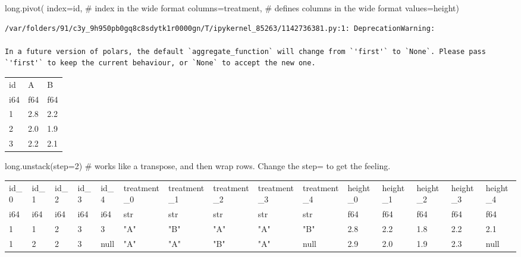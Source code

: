 \documentclass[
  letterpaper,
  DIV=11,
  numbers=noendperiod]{scrartcl}
\newenvironment{Shaded}{\begin{snugshade}}{\end{snugshade}}
\newcommand{\BuiltInTok}[1]{\textcolor[rgb]{0.00,0.23,0.31}{#1}}
\newcommand{\CommentTok}[1]{\textcolor[rgb]{0.37,0.37,0.37}{#1}}
\newcommand{\DecValTok}[1]{\textcolor[rgb]{0.68,0.00,0.00}{#1}}
\newcommand{\NormalTok}[1]{\textcolor[rgb]{0.00,0.23,0.31}{#1}}
\newcommand{\OperatorTok}[1]{\textcolor[rgb]{0.37,0.37,0.37}{#1}}
\newcommand{\StringTok}[1]{\textcolor[rgb]{0.13,0.47,0.30}{#1}}
\begin{document}
\begin{Shaded}
\begin{Highlighting}[]
\BuiltInTok{long}\NormalTok{.pivot(}
\NormalTok{  index}\OperatorTok{=}\StringTok{\textquotesingle{}id\textquotesingle{}}\NormalTok{, }\CommentTok{\# index in the wide format}
\NormalTok{  columns}\OperatorTok{=}\StringTok{\textquotesingle{}treatment\textquotesingle{}}\NormalTok{, }\CommentTok{\# defines columns in the wide format}
\NormalTok{  values}\OperatorTok{=}\StringTok{\textquotesingle{}height\textquotesingle{}}\NormalTok{)}
\end{Highlighting}
\end{Shaded}

\begin{verbatim}
/var/folders/91/c3y_9h950pb0gq8c8sdytk1r0000gn/T/ipykernel_85263/1142736381.py:1: DeprecationWarning:

In a future version of polars, the default `aggregate_function` will change from `'first'` to `None`. Please pass `'first'` to keep the current behaviour, or `None` to accept the new one.
\end{verbatim}

\begin{longtable}[]{@{}lll@{}}
\toprule()
id & A & B \\
i64 & f64 & f64 \\
\midrule()
\endhead
1 & 2.8 & 2.2 \\
2 & 2.0 & 1.9 \\
3 & 2.2 & 2.1 \\
\bottomrule()
\end{longtable}

\begin{Shaded}
\begin{Highlighting}[]
\BuiltInTok{long}\NormalTok{.unstack(step}\OperatorTok{=}\DecValTok{2}\NormalTok{) }\CommentTok{\# works like a transpose, and then wrap rows. Change the \textasciigrave{}step=\textasciigrave{} to get the feeling. }
\end{Highlighting}
\end{Shaded}

\begin{longtable}[]{@{}lllllllllllllll@{}}
\toprule()
id\_0 & id\_1 & id\_2 & id\_3 & id\_4 & treatment\_0 & treatment\_1 &
treatment\_2 & treatment\_3 & treatment\_4 & height\_0 & height\_1 &
height\_2 & height\_3 & height\_4 \\
i64 & i64 & i64 & i64 & i64 & str & str & str & str & str & f64 & f64 &
f64 & f64 & f64 \\
\midrule()
\endhead
1 & 1 & 2 & 3 & 3 & "A" & "B" & "A" & "A" & "B" & 2.8 & 2.2 & 1.8 & 2.2
& 2.1 \\
1 & 2 & 2 & 3 & null & "A" & "A" & "B" & "A" & null & 2.9 & 2.0 & 1.9 &
2.3 & null \\
\bottomrule()
\end{longtable}
\end{document}

